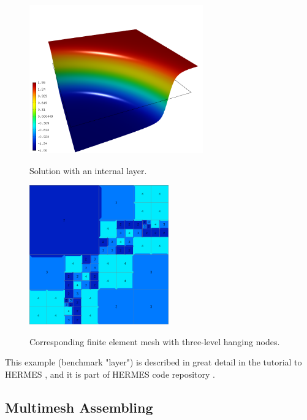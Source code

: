 \documentclass[final,3p,times,twocolumn]{elsarticle}
\begin{document}
\begin{figure}[!htb]
\begin{center}
 {
\includegraphics[width=7.5cm]{atan-2.png}
}
\end{center}
\vspace{-5mm}
\caption{Solution with an internal layer.}
\label{fig:atan-2}
\end{figure}

\begin{figure}[!htb]
\begin{center}
 {
\includegraphics[width=6cm]{atan-1.png}
}
\end{center}
\vspace{-5mm}
\caption{Corresponding finite element mesh with three-level hanging nodes.}
\label{fig:atan-1}
\end{figure}

This example (benchmark "layer") is described in great detail in the tutorial to 
HERMES \cite{hermes}, and it is part of HERMES code repository \cite{hermes-repo}.

\subsection{Multimesh Assembling}\label{subsec:multimesh}
\end{document}
